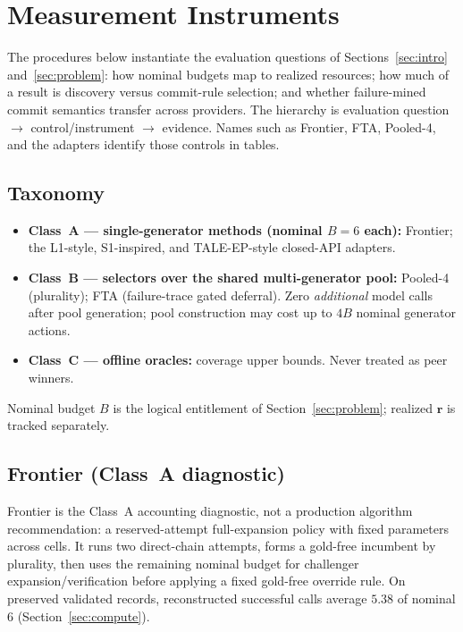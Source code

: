\section{Measurement Instruments}
\label{sec:method}

The procedures below instantiate the evaluation questions of Sections~\ref{sec:intro}
and~\ref{sec:problem}: how nominal budgets map to realized resources; how much of a result
is discovery versus commit-rule selection; and whether failure-mined commit semantics transfer
across providers. The hierarchy is evaluation question $\rightarrow$ control/instrument
$\rightarrow$ evidence. Names such as Frontier, FTA, Pooled-4, and the adapters identify those
controls in tables.

\subsection{Taxonomy}
\label{sec:method-taxonomy}

\begin{itemize}
\item \textbf{Class~A --- single-generator methods (nominal $B{=}6$ each):}
Frontier; the L1-style, S1-inspired, and TALE-EP-style closed-API adapters.
\item \textbf{Class~B --- selectors over the shared multi-generator pool:}
Pooled-4 (plurality); FTA (failure-trace gated deferral). Zero \emph{additional} model calls after
pool generation; pool construction may cost up to $4B$ nominal generator actions.
\item \textbf{Class~C --- offline oracles:}
coverage upper bounds. Never treated as peer winners.
\end{itemize}
Nominal budget $B$ is the logical entitlement of Section~\ref{sec:problem}; realized
$\mathbf{r}$ is tracked separately.

\subsection{Frontier (Class~A diagnostic)}
\label{sec:method-frontier}

Frontier is the Class~A accounting diagnostic, not a production algorithm recommendation: a
reserved-attempt full-expansion policy with fixed parameters across cells. It runs two direct-chain
attempts, forms a gold-free incumbent by plurality, then uses the remaining nominal budget for
challenger expansion/verification before applying a fixed gold-free override rule. On preserved
validated records, reconstructed successful calls average $5.38$ of nominal $6$
(Section~\ref{sec:compute}).

